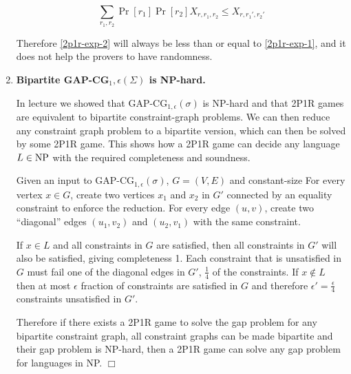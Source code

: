 \documentclass[12pt]{article}
\makeatletter
\renewcommand{\section}{\@startsection{section}{1}{0mm}
   {\baselineskip}%
   {\baselineskip}{\normalfont\normalsize}}%
\makeatother
\begin{document}
\begin{enumerate}
\begin{equation}
\sum_{r_1,r_2}{\Pr{\left[r_1\right]}\Pr{\left[r_2\right]}X_{r,r_1,r_2}} \le X_{r,r_1',r_2'}
\end{equation}

Therefore
\ref{2p1r-exp-2} will always be less than or equal to \ref{2p1r-exp-1}, and
it does not help the provers to have randomness.

\item
\textbf{Bipartite GAP-CG$_1,\epsilon(\Sigma)$ is NP-hard.}

In lecture we showed that GAP-CG$_{1,\epsilon}(\sigma)$ is NP-hard and
that 2P1R games are equivalent to bipartite constraint-graph
problems. We can then reduce any constraint graph problem
to a bipartite version,
which can then be solved by some 2P1R game. This shows how a
2P1R game can decide any language $L \in \mathrm{NP}$ with the required
completeness and soundness.

Given an input to GAP-CG$_{1,\epsilon}(\sigma)$, $G = (V,E)$ and constant-size 
For every vertex $x \in G$, create two vertices $x_1$ and $x_2$ in
$G'$ connected by an equality constraint to enforce the reduction.
For every edge $(u,v)$, create two ``diagonal''
edges $(u_1,v_2)$ and $(u_2,v_1)$ with the same constraint.

If $x \in L$ and all constraints in $G$ are satisfied,
then all constraints in $G'$ will
also be satisfied, giving completeness 1.
Each constraint that is unsatisfied in $G$
must fail one of the diagonal edges in $G'$,
$\frac{1}{4}$ of the constraints.
If $x \notin L$ then at most $\epsilon$ fraction of
constraints are satisfied in $G$ and therefore $\epsilon' = \frac{\epsilon}{4}$
constraints unsatisfied in $G'$.

Therefore if there exists a 2P1R game to solve the gap problem for any 
bipartite constraint graph, all constraint graphs can be made bipartite and
their gap problem is NP-hard, then a 2P1R game can solve any gap problem for
languages in NP.
$\Box$

\end{enumerate}


\end{document}
